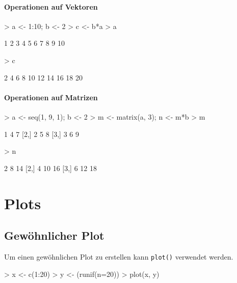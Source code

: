 \paragraph{Operationen auf Vektoren}
\begin{Schunk}
\begin{Sinput}
> a <- 1:10; b <- 2
> c <- b*a
> a
\end{Sinput}
\begin{Soutput}
 [1]  1  2  3  4  5  6  7  8  9 10
\end{Soutput}
\begin{Sinput}
> c
\end{Sinput}
\begin{Soutput}
 [1]  2  4  6  8 10 12 14 16 18 20
\end{Soutput}
\end{Schunk}

\paragraph{Operationen auf Matrizen}
\begin{Schunk}
\begin{Sinput}
> a <- seq(1, 9, 1); b <- 2
> m <- matrix(a, 3); n <- m*b
> m
\end{Sinput}
\begin{Soutput}
     [,1] [,2] [,3]
[1,]    1    4    7
[2,]    2    5    8
[3,]    3    6    9
\end{Soutput}
\begin{Sinput}
> n
\end{Sinput}
\begin{Soutput}
     [,1] [,2] [,3]
[1,]    2    8   14
[2,]    4   10   16
[3,]    6   12   18
\end{Soutput}
\end{Schunk}

\section{Plots}

\subsection{Gewöhnlicher Plot}
Um einen gewöhnlichen Plot zu erstellen kann \lstinline{plot()}
verwendet werden. 

\begin{Schunk}
\begin{Sinput}
> x <- c(1:20)
> y <- (runif(n=20))
> plot(x, y)
\end{Sinput}
\end{Schunk}


